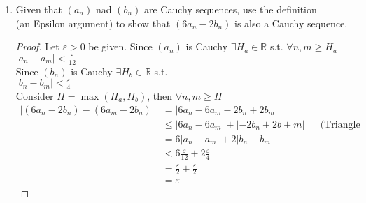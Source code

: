\documentclass[12pt]{article}
\begin{document}
\begin{enumerate}
\begin{proof}
		      $|b_n-b_m| < \frac{\varepsilon}{2A}$ \\
		      Consider $H = \max(H_a, H_b)$, then $\forall n,m \in \mathbb{R}$
		      \begin{align*}
			      |a_{n}b_n - a_{m}b_m| & = |a_{n}b_n - a_{n}b_m + a_{n}b_m - a_{m}b_m|                                                \\
			                            & \leq |a_{n}b_n - a_{n}b_m| + |a_{n}b_m - a_{m}b_m|         &  & \text{(Triangle Inequality)} \\
			                            & = |a_n||b_n-b_m| + |b_m||a_n-a_m|                                                            \\
			                            & \leq A|b_n-b_m| + B|a_n-a_m|                                                                 \\
			                            & < A(\frac{\varepsilon}{2A}) + B(\frac{\varepsilon}{2B})                                   \\
			                            & = \frac{\varepsilon}{2} + \frac{\varepsilon}{2}                                              \\
			                            & = \varepsilon
		      \end{align*}
	      \end{proof}
          \item Given that $(a_n)$ nad $(b_n)$ are Cauchy sequences, use the definition \\ 
          (an Epsilon argument) to show that $(6a_n-2b_n)$ is also a Cauchy sequence.
          \begin{proof}
              Let $\varepsilon > 0$ be given. Since $(a_n)$ is Cauchy $\exists H_a \in \mathbb{R}$ s.t. $\forall n,m \geq H_a$ \\
              $|a_n-a_m| < \frac{\varepsilon}{12}$ \\
              Since $(b_n)$ is Cauchy $\exists H_b \in \mathbb{R}$ s.t. \\
              $|b_n-b_m| < \frac{\varepsilon}{4}$ \\
              Consider $H = \max(H_a, H_b)$, then $\forall n,m \geq H$
              \begin{align*}
                  |(6a_n-2b_n) - (6a_m-2b_n)| &= |6a_n-6a_m - 2b_n + 2b_m| \\
                  &\leq |6a_n-6a_m| + |-2b_n+2b+m| && \text{(Triangle Inequality)} \\
                  &= 6|a_n-a_m| + 2|b_n-b_m| \\
                  &< 6\frac{\varepsilon}{12} + 2\frac{\varepsilon}{4} \\
                  &= \frac{\varepsilon}{2} + \frac{\varepsilon}{2} \\
                  &= \varepsilon
              \end{align*}
          \end{proof}
\end{enumerate}
\end{document}
